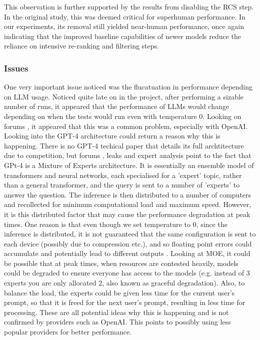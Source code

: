 This observation is further supported by the results from disabling the RCS step. In the original study, this was deemed critical for superhuman performance. In our experiments, its removal still yielded near-human performance, once again indicating that the improved baseline capabilities of newer models reduce the reliance on intensive re-ranking and filtering steps. \\

\subsubsection{Issues}
One very important issue noticed was the flucatuation in performance depending on LLM usage.
Noticed quite late on in the project, after performing a sizable number of runs, it appeared that the performance of LLMs would change depending on when the tests would run even with temperature 0. Looking on forums \cite{beconvincible_does_2023}, it appeared that this was a common problem, especially with OpenAI. Looking into the GPT-4 architecture could return a reason why this is happening. There is no GPT-4 techical paper that details its full archtitecture due to competition, but forums \cite{gwern_gpt-4_2023} , leaks  and expert analysis \cite{swyx_swyx_latentspacepod_2023} \cite{soumith_chintala_soumithchintala_i_2023} \cite{betts_peering_2023} point to the fact that GPt-4 is a Mixture of Experts architecture. It is essentially an ensemble model of transformers and neural networks, each specialised for a 'expert' topic, rather than a general transformer, and the query is sent to a number of 'experts' to answer the question. The inference is then distributed to a number of computers and recollected for minimum computational load and maximum speed. However, it is this distributed factor that may cause the performance degradation at peak times. One reason is that even though we set temperature to 0, since the inference is distributed, it is not guaranteed that the same configuration is sent to each device (possibly due to compression etc.), and so floating point errors could accumulate and potentially lead to different outputs \cite{noauthor_non-determinism_2023}. Looking at MOE, it could be possible that at peak times, when resources are contested heavily, models could be degraded to ensure everyone has access to the models (e.g. instead of 3 experts you are only allocated 2, also known as graceful degradation). Also, to balance the load, the experts could be given less time for the current user's prompt, so that it is freed for the next user's prompt, resulting in less time for processing. These are all potential ideas why this is happening and is not confirmed by providers such as OpenAI. This points to possibly using less popular providers for better performance. \\

